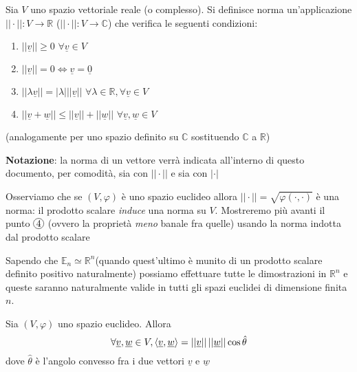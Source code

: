 \begin{definition}[norma]
	Sia $V$ uno spazio vettoriale reale (o complesso). Si definisce norma un'applicazione $|| \cdot ||: V \to \mathbb{R}$ ($|| \cdot ||: V \to \mathbb{C}$) che verifica le seguenti condizioni:
	\begin{enumerate}[label=\protect\circled{\arabic*}]
		\item $||\underline{v}|| \geq 0 \, \, \forall \underline{v} \in V$
		\item $|| \underline{v} || = 0 \iff \underline{v} = \underline{0}$
		\item $|| \lambda \underline{v} || = | \lambda | || \underline{v} || \, \, \forall \lambda \in \mathbb{R}, \forall \underline{v} \in V$
		\item $|| \underline{v} + \underline{w} || \leq || \underline{v} || + || \underline{w} || \, \, \forall \underline{v}, \underline{w} \in V$
	\end{enumerate}
	(analogamente per uno spazio definito su $\mathbb{C}$ sostituendo $\mathbb{C}$ a $\mathbb{R}$)
\end{definition}
\noindent \textbf{Notazione}: la norma di un vettore verrà indicata all'interno di questo documento, per comodità, sia con $||\cdot||$ e sia con $|\cdot|$
\begin{remark}
Osserviamo che se $(V, \varphi)$ è uno spazio euclideo allora $|| \cdot || = \sqrt{\varphi(\cdot, \cdot)}$ è una norma: il prodotto scalare \emph{induce} una norma su $V$. Mostreremo più avanti il punto $\circled{4}$ (ovvero la proprietà \emph{meno} banale fra quelle) usando la norma indotta dal prodotto scalare
\end{remark}
\noindent Sapendo che $\mathbb{E}_n \simeq \mathbb{R}^n$(quando quest'ultimo è munito di un prodotto scalare definito positivo naturalmente) possiamo effettuare tutte le dimostrazioni in $\mathbb{R}^n$ e queste saranno naturalmente valide in tutti gli spazi euclidei di dimensione finita $n$. 
\begin{theorem} Sia $(V, \varphi)$ uno spazio euclideo. Allora $$\forall \underline{v}, \underline{w} \in V, \langle \underline{v}, \underline{w} \rangle = ||\underline{v}|| \, || \underline{w} || \cos{\hat{\theta}}$$
dove $\hat{\theta}$ è l'angolo convesso fra i due vettori $\underline{v}$ e $\underline{w}$
\end{theorem}
